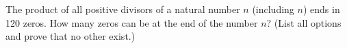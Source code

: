 \problem
The product of all positive divisors of a natural number $n$ (including $n$) ends in 120 zeros. 
How many zeros can be at the end of the number $n$? 
(List all options and prove that no other exist.)
\solution
\endproblem
